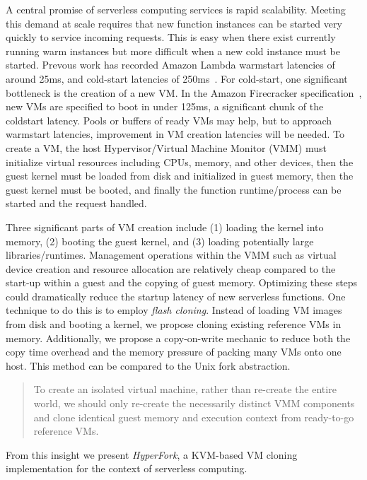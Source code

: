  A central promise of
serverless computing services is rapid scalability. Meeting this demand at
scale requires that new function instances can be started very quickly to
service incoming requests. This is easy when there exist currently running
warm instances but more difficult when a new cold instance must be started.
Prevous work has recorded Amazon Lambda warmstart latencies of around 25ms, and
cold-start latencies of 250ms~\cite{peeking}. For cold-start, one significant
bottleneck is the creation of a new VM. In the Amazon Firecracker
specification~\cite{firecracker-spec}, new VMs are specified to boot in under
125ms, a significant chunk of the coldstart latency. Pools or buffers of ready
VMs may help, but to approach warmstart latencies, improvement in VM creation
latencies will be needed. To create a VM, the host Hypervisor/Virtual Machine
Monitor (VMM) must initialize virtual resources including CPUs, memory, and
other devices, then the guest kernel must be loaded from disk and initialized
in guest memory, then the guest kernel must be booted, and finally the function
runtime/process can be started and the request handled.

 Three significant parts of VM creation include (1)
loading the kernel into memory, (2) booting the guest kernel,
and (3) loading potentially large libraries/runtimes. Management operations
within the VMM such as virtual device creation and resource allocation are
relatively cheap compared to the start-up within a guest and the copying of
guest memory. Optimizing these steps could dramatically reduce the startup
latency of new serverless functions. One technique to do this is to employ
\emph{flash cloning}. Instead of loading VM images from disk and booting a
kernel, we propose cloning existing reference VMs in memory. Additionally, we
propose a copy-on-write mechanic to reduce both the copy time overhead and the
memory pressure of packing many VMs onto one host. This method can be compared
to the Unix fork abstraction.


\begin{quote} To create an isolated virtual machine, rather than re-create the
entire world, we should only re-create the necessarily distinct VMM components
and clone identical guest memory and execution context from ready-to-go
reference VMs.
\end{quote}

From this insight we present \emph{HyperFork}, a KVM-based VM cloning
implementation for the context of serverless computing.


